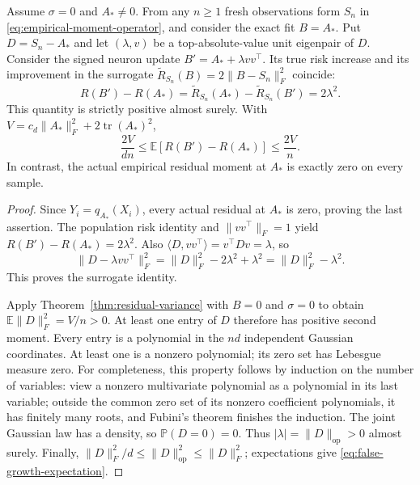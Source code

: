 \begin{theorem}
\label{thm:false-growth}
Assume $\sigma=0$ and $A_*\ne0$. From any $n\geq1$ fresh observations
form $S_n$ in \eqref{eq:empirical-moment-operator}, and consider the exact
fit $B=A_*$. Put $D=S_n-A_*$ and let $(\lambda,v)$ be a top-absolute-value
unit eigenpair of $D$. Consider the signed neuron update
$B'=A_*+\lambda vv^\top$. Its true risk increase and its improvement in
the surrogate $\widetilde R_{S_n}(B)=2\|B-S_n\|_F^2$ coincide:
\begin{equation}
 R(B')-R(A_*)
 =\widetilde R_{S_n}(A_*)-\widetilde R_{S_n}(B')
 =2\lambda^2.
 \label{eq:false-growth-gain}
\end{equation}
This quantity is strictly positive almost surely. With
$V=c_d\|A_*\|_F^2+2\operatorname{tr}(A_*)^2$,
\begin{equation}
 \frac{2V}{dn}
 \leq\mathbb E[R(B')-R(A_*)]
 \leq\frac{2V}{n}.
 \label{eq:false-growth-expectation}
\end{equation}
In contrast, the actual empirical residual moment at $A_*$ is exactly
zero on every sample.
\end{theorem}
\begin{proof}
Since $Y_i=q_{A_*}(X_i)$, every actual residual at $A_*$ is zero, proving
the last assertion. The population risk identity and
$\|vv^\top\|_F=1$ yield $R(B')-R(A_*)=2\lambda^2$.
Also $\langle D,vv^\top\rangle=v^\top Dv=\lambda$, so
\[
 \|D-\lambda vv^\top\|_F^2
 =\|D\|_F^2-2\lambda^2+\lambda^2
 =\|D\|_F^2-\lambda^2.
\]
This proves the surrogate identity.

Apply Theorem~\ref{thm:residual-variance} with $B=0$ and $\sigma=0$
to obtain $\mathbb E\|D\|_F^2=V/n>0$. At least one entry of $D$
therefore has positive second moment. Every entry is a polynomial in
the $nd$ independent Gaussian coordinates. At least one is a nonzero
polynomial; its zero set has Lebesgue measure zero. For completeness,
this property follows by induction on the number of variables: view a
nonzero multivariate polynomial as a polynomial in its last variable;
outside the common zero set of its nonzero coefficient polynomials,
it has finitely many roots, and Fubini's theorem finishes the induction.
The joint Gaussian law has a density, so $\mathbb P(D=0)=0$.
Thus $|\lambda|=\|D\|_{\mathrm{op}}>0$ almost surely.
Finally,
$\|D\|_F^2/d\leq\|D\|_{\mathrm{op}}^2\leq\|D\|_F^2$;
expectations give \eqref{eq:false-growth-expectation}.
\end{proof}

